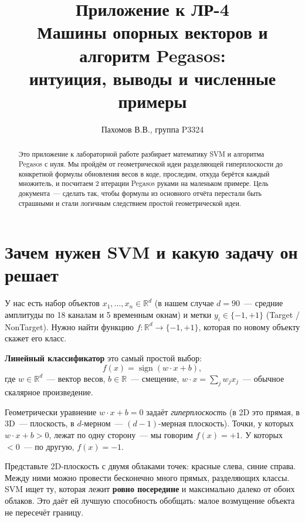 \documentclass[12pt,a4paper]{article}
\title{\textbf{Приложение к ЛР-4}\\\large Машины опорных векторов и алгоритм Pegasos:\\интуиция, выводы и численные примеры}
\author{Пахомов В.В., группа P3324}
\date{}
\newcommand{\R}{\mathbb{R}}
\newcommand{\sign}{\operatorname{sign}}
\begin{document}
\maketitle

\begin{abstract}
\noindent Это приложение к лабораторной работе разбирает математику SVM и алгоритма Pegasos с нуля. Мы пройдём от геометрической идеи разделяющей гиперплоскости до конкретной формулы обновления весов в коде, проследим, откуда берётся каждый множитель, и посчитаем 2 итерации Pegasos руками на маленьком примере. Цель документа~--- сделать так, чтобы формулы из основного отчёта перестали быть страшными и стали логичным следствием простой геометрической идеи.
\end{abstract}

\tableofcontents
\vspace{0.5cm}

\section{Зачем нужен SVM и какую задачу он решает}

У нас есть набор объектов $x_1, \ldots, x_n \in \R^d$ (в нашем случае $d = 90$~--- средние амплитуды по 18 каналам и 5 временным окнам) и метки $y_i \in \{-1, +1\}$ (Target / NonTarget). Нужно найти функцию $f\colon \R^d \to \{-1, +1\}$, которая по новому объекту скажет его класс.

\textbf{Линейный классификатор} это самый простой выбор:
\[
  f(x) = \sign(w \cdot x + b),
\]
где $w \in \R^d$~--- вектор весов, $b \in \R$~--- смещение, $w \cdot x = \sum_j w_j x_j$~--- обычное скалярное произведение.

Геометрически уравнение $w \cdot x + b = 0$ задаёт \emph{гиперплоскость} (в 2D это прямая, в 3D~--- плоскость, в $d$-мерном~--- $(d{-}1)$-мерная плоскость). Точки, у которых $w \cdot x + b > 0$, лежат по одну сторону~--- мы говорим $f(x) = +1$. У которых $< 0$~--- по другую, $f(x) = -1$.

\begin{intuition}
Представьте 2D-плоскость с двумя облаками точек: красные слева, синие справа. Между ними можно провести бесконечно много прямых, разделяющих классы. SVM ищет ту, которая лежит \textbf{ровно посередине} и максимально далеко от обоих облаков. Это даёт ей лучшую способность обобщать: малое возмущение объекта не пересечёт границу.
\end{intuition}
\end{document}
